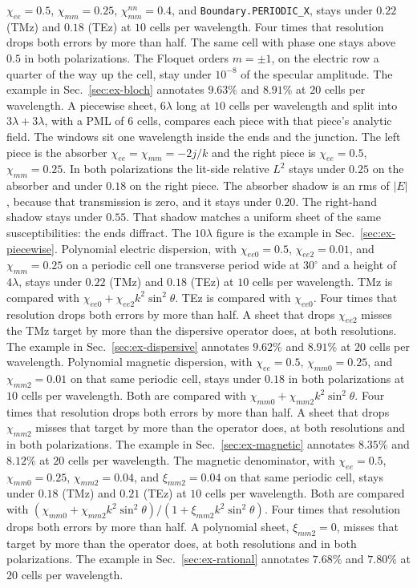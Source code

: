 \documentclass[11pt,a4paper]{article}
\begin{document}
$\chi_{ee}=0.5$, $\chi_{mm}=0.25$, $\chi_{mm}^{nn}=0.4$, and
\texttt{Boundary.PERIODIC\_X}, stays under $0.22$ (TMz) and $0.18$
(TEz) at $10$ cells per wavelength. Four times that resolution drops
both errors by more than half. The same cell with phase one stays above
$0.5$ in both polarizations. The Floquet orders $m=\pm 1$, on the
electric row a quarter of the way up the cell, stay under $10^{-8}$ of
the specular amplitude. The example in Sec.~\ref{sec:ex-bloch} annotates
$9.63\%$ and $8.91\%$ at $20$ cells per wavelength.
A piecewise sheet, $6\lambda$ long at $10$ cells per wavelength and split
into $3\lambda+3\lambda$, with a PML of $6$ cells, compares each piece
with that piece's analytic field. The windows sit one wavelength inside
the ends and the junction. The left piece is the absorber
$\chi_{ee}=\chi_{mm}=-2j/k$ and the right piece is $\chi_{ee}=0.5$,
$\chi_{mm}=0.25$. In both polarizations the lit-side relative $L^2$ stays
under $0.25$ on the absorber and under $0.18$ on the right piece. The
absorber shadow is an rms of $|E|$, because that transmission is zero,
and it stays under $0.20$. The right-hand shadow stays under $0.55$.
That shadow matches a uniform sheet of the same susceptibilities: the
ends diffract. The $10\lambda$ figure is the example in
Sec.~\ref{sec:ex-piecewise}.
Polynomial electric dispersion, with $\chi_{ee0}=0.5$, $\chi_{ee2}=0.01$,
and $\chi_{mm}=0.25$ on a periodic cell one transverse period wide at
$30^\circ$ and a height of $4\lambda$, stays under $0.22$ (TMz) and
$0.18$ (TEz) at $10$ cells per wavelength. TMz is compared with
$\chi_{ee0}+\chi_{ee2}k^2\sin^2\theta$. TEz is compared with
$\chi_{ee0}$. Four times that resolution drops both errors by more than
half. A sheet that drops $\chi_{ee2}$ misses the TMz target by more than
the dispersive operator does, at both resolutions. The example in
Sec.~\ref{sec:ex-dispersive} annotates $9.62\%$ and $8.91\%$ at $20$
cells per wavelength.
Polynomial magnetic dispersion, with $\chi_{ee}=0.5$, $\chi_{mm0}=0.25$,
and $\chi_{mm2}=0.01$ on that same periodic cell, stays under $0.18$
in both polarizations at $10$ cells per wavelength. Both are compared
with $\chi_{mm0}+\chi_{mm2}k^2\sin^2\theta$. Four times that resolution
drops both errors by more than half. A sheet that drops $\chi_{mm2}$
misses that target by more than the operator does, at both resolutions
and in both polarizations. The example in Sec.~\ref{sec:ex-magnetic}
annotates $8.35\%$ and $8.12\%$ at $20$ cells per wavelength.
The magnetic denominator, with $\chi_{ee}=0.5$, $\chi_{mm0}=0.25$,
$\chi_{mm2}=0.04$, and $\xi_{mm2}=0.04$ on that same periodic cell,
stays under $0.18$ (TMz) and $0.21$ (TEz) at $10$ cells per wavelength.
Both are compared with
$(\chi_{mm0}+\chi_{mm2}k^2\sin^2\theta)/(1+\xi_{mm2}k^2\sin^2\theta)$.
Four times that resolution drops both errors by more than half. A
polynomial sheet, $\xi_{mm2}=0$, misses that target by more than the
operator does, at both resolutions and in both polarizations. The
example in Sec.~\ref{sec:ex-rational} annotates $7.68\%$ and $7.80\%$
at $20$ cells per wavelength.
\end{document}
